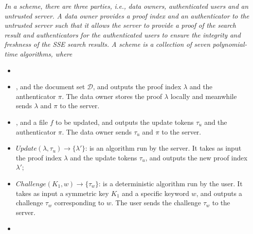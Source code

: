 \begin{definition}\label{def:name}
  {\itshape
      In a \name scheme, there are three parties, i.e., data owners, authenticated users and an untrusted server.  A data owner provides a proof index and an authenticator to the untrusted server such that it allows the server to provide a proof of the search result and authenticators for the authenticated users to ensure the integrity and freshness of the SSE search results. A \name scheme is a collection of seven polynomial-time algorithms, where
      \begin{itemize}
        \item {}
        \item {}, and the document set $\mathcal{D}$, and outputs the proof index $\lambda$ and the anthenticator $\pi$. The data owner stores the proof $\lambda$ locally and meanwhile sends $\lambda$ and $\pi$ to the server.
        \item {}, and a file $f$ to be updated, and outputs the update tokens $\tau_u$ and the authenticator $\pi$. The data owner sends $\tau_u$ and $\pi$ to the server.
        \item $Update(\lambda, \tau_u) \rightarrow \{\lambda'\}$: is an algorithm run by the server. It takes as input the proof index $\lambda$ and the update tokens $\tau_u$, and outputs the new proof index $\lambda'$;
        \item $Challenge(K_1, w) \rightarrow \{\tau_{w}\}$: is a deterministic algorithm run by the user. It takes as input a symmetric key $K_1$ and a specific keyword $w$, and outputs a challenge $\tau_{w}$ corresponding to $w$. The user sends the challenge $\tau_{w}$ to the server.
        \item {}

\end{itemize}}
\end{definition}

